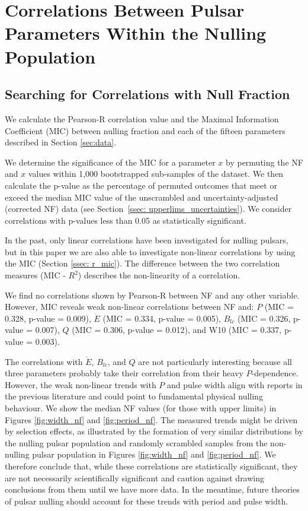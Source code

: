 \documentclass[fleqn,usenatbib]{mnras}
\begin{document}
\section{Correlations Between Pulsar Parameters Within the Nulling Population}
\label{sec: correlations}

\subsection{Searching for Correlations with Null Fraction}
\label{ssec: null_correlations}

We calculate the Pearson-R correlation value and the Maximal Information Coefficient (MIC) between nulling fraction and each of the fifteen parameters described in Section \ref{sec:data}. 

We determine the significance of the MIC for a parameter $x$ by permuting the NF and $x$ values within 1,000 bootstrapped sub-samples of the dataset. We then calculate the p-value as the percentage of permuted outcomes that meet or exceed the median MIC value of the unscrambled and uncertainty-adjusted (corrected NF) data (see Section~\ref{ssec: upperlims_uncertainties}). We consider correlations with p-values less than 0.05 as statistically significant.

In the past, only linear correlations have been investigated for nulling pulsars, but in this paper we are also able to investigate non-linear correlations by using the MIC (Section \ref{ssec: r_mic}). The difference between the two correlation measures (MIC - $R^2$) describes the non-linearity of a correlation. 

We find no correlations shown by Pearson-R between NF and any other variable. However, MIC reveals weak non-linear correlations between NF and: $P$ (MIC = 0.328, p-value = 0.009), $\Dot{E}$ (MIC = 0.334, p-value = 0.005), $B_{lc}$ (MIC = 0.326, p-value = 0.007), $Q$ (MIC = 0.306, p-value = 0.012), and W10 (MIC = 0.337, p-value = 0.003). 

The correlations with $\Dot{E}$, $B_{lc}$, and $Q$ are not particularly interesting because all three parameters probably take their correlation from their heavy $P$-dependence. However, the weak non-linear trends with $P$ and pulse width align with reports in the previous literature \citep{biggs1992analysis,Li1995} and could point to fundamental physical nulling behaviour. We show the median NF values (for those with upper limits) in Figures \ref{fig:width_nf} and \ref{fig:period_nf}. The measured trends might be driven by selection effects, as illustrated by the formation of very similar distributions by the nulling pulsar population and randomly scrambled samples from the non-nulling pulsar population in Figures \ref{fig:width_nf} and \ref{fig:period_nf}. We therefore conclude that, while these correlations are statistically significant, they are not necessarily scientifically significant and caution against drawing conclusions from them until we have more data. In the meantime, future theories of pulsar nulling should account for these trends with period and pulse width. 
\end{document}
